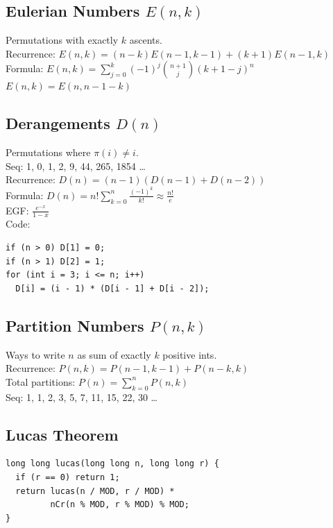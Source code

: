 \subsection{Eulerian Numbers $E(n,k)$}
Permutations with exactly $k$ ascents. \\
\textbullet{} Recurrence: $E(n,k) = (n-k)E(n-1,k-1) + (k+1)E(n-1,k)$ \\
\textbullet{} Formula: $E(n,k) = \sum_{j=0}^k (-1)^j \binom{n+1}{j} (k+1-j)^n$ \\
\textbullet{} $E(n,k) = E(n, n-1-k)$

\subsection{Derangements $D(n)$}
Permutations where $\pi(i) \neq i$. \\
Seq: 1, 0, 1, 2, 9, 44, 265, 1854 \dots \\
\textbullet{} Recurrence: $D(n) = (n-1)(D(n-1) + D(n-2))$ \\
\textbullet{} Formula: $D(n) = n! \sum_{k=0}^n \frac{(-1)^k}{k!} \approx \frac{n!}{e}$ \\
\textbullet{} EGF: $\frac{e^{-x}}{1-x}$ \\
\textbullet{} Code:
\begin{verbatim}
if (n > 0) D[1] = 0;
if (n > 1) D[2] = 1;
for (int i = 3; i <= n; i++)
  D[i] = (i - 1) * (D[i - 1] + D[i - 2]);
\end{verbatim}

\subsection{Partition Numbers $P(n,k)$}
Ways to write $n$ as sum of exactly $k$ positive ints. \\
\textbullet{} Recurrence: $P(n,k) = P(n-1,k-1) + P(n-k,k)$ \\
\textbullet{} Total partitions: $P(n) = \sum_{k=0}^n P(n,k)$ \\
Seq: 1, 1, 2, 3, 5, 7, 11, 15, 22, 30 \dots

\subsection{Lucas Theorem}
\begin{verbatim}
long long lucas(long long n, long long r) {
  if (r == 0) return 1;
  return lucas(n / MOD, r / MOD) *
         nCr(n % MOD, r % MOD) % MOD;
}
\end{verbatim}

